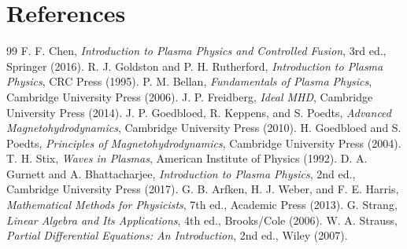 \documentclass[11pt]{article}
\begin{document}
\section{References}
\begin{thebibliography}{99}
 F. F. Chen, \emph{Introduction to Plasma Physics and Controlled Fusion}, 3rd ed., Springer (2016).
 R. J. Goldston and P. H. Rutherford, \emph{Introduction to Plasma Physics}, CRC Press (1995).
 P. M. Bellan, \emph{Fundamentals of Plasma Physics}, Cambridge University Press (2006).
 J. P. Freidberg, \emph{Ideal MHD}, Cambridge University Press (2014).
 J. P. Goedbloed, R. Keppens, and S. Poedts, \emph{Advanced Magnetohydrodynamics}, Cambridge University Press (2010).
 H. Goedbloed and S. Poedts, \emph{Principles of Magnetohydrodynamics}, Cambridge University Press (2004).
 T. H. Stix, \emph{Waves in Plasmas}, American Institute of Physics (1992).
 D. A. Gurnett and A. Bhattacharjee, \emph{Introduction to Plasma Physics}, 2nd ed., Cambridge University Press (2017).
 G. B. Arfken, H. J. Weber, and F. E. Harris, \emph{Mathematical Methods for Physicists}, 7th ed., Academic Press (2013).
 G. Strang, \emph{Linear Algebra and Its Applications}, 4th ed., Brooks/Cole (2006).
 W. A. Strauss, \emph{Partial Differential Equations: An Introduction}, 2nd ed., Wiley (2007).
\end{thebibliography}
\end{document}
